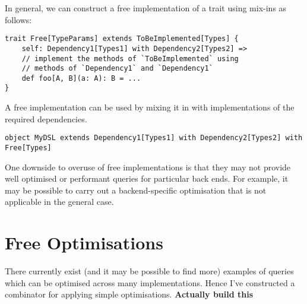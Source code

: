 \documentclass{report}
\newcommand \2[0]{\textbf{2}}
\newcommand \3[0]{\textbf{3}}
\newcommand{\todo}[1]{\textbf{#1}}
\begin{document}
In general, we can construct a free implementation of a trait using mix-ins as follows:

\begin{verbatim}
trait Free[TypeParams] extends ToBeImplemented[Types] {
    self: Dependency1[Types1] with Dependency2[Types2] =>
    // implement the methods of `ToBeImplemented` using 
    // methods of `Dependency1` and `Dependency1`
    def foo[A, B](a: A): B = ...
}
\end{verbatim}

A free implementation can be used by mixing it in with implementations of the required dependencies.

\begin{verbatim}
object MyDSL extends Dependency1[Types1] with Dependency2[Types2] with Free[Types]
\end{verbatim}

One downside to overuse of free implementations is that they may not provide well optimised or performant queries for particular back ends. For example, it may be possible to carry out a backend-specific optimisation that is not applicable in the general case.

\chapter{Free Optimisations}
There currently exist (and it may be possible to find more) examples of queries which can be optimised across many implementations. Hence I've constructed a combinator for applying simple optimisations. \todo{Actually build this}
    
\end{document}
